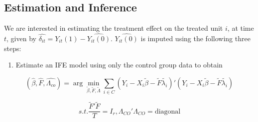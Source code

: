 \documentclass[12pt,nobind, a4paper]{reedthesis}
\providecommand{\tightlist}{%
	\setlength{\itemsep}{0pt}\setlength{\parskip}{0pt}}
\begin{document}
 \hypertarget{estimation-and-inference}{%
 \subsection{Estimation and Inference}\label{estimation-and-inference}}

 We are interested in estimating the treatment effect on the treated unit \(i\), at time \(t\), given by \(\hat{\delta_{it}}= Y_{it}(1)-\hat{Y_{it}(0)}\). \(\hat{Y_{it}(0)}\) is imputed using the following three steps:
 \linebreak
 \begin{enumerate}
 \def\labelenumi{\arabic{enumi}.}
 \tightlist
 \item
   Estimate an IFE model using only the control group data to obtain
 \end{enumerate}
 \[(\hat{\beta},\hat{F},\hat{\Lambda_{co}})=\arg\min_{\tilde{\beta},\tilde{F},\tilde{\Lambda}}\sum_{i\in C}(Y_{i}-X_{i} \tilde{\beta}-\tilde{F}\tilde{\lambda_{i}})'(Y_{i}-X_{i}\tilde{\beta}-\tilde{F}\tilde{\lambda_{i}})\]

 \[s.t. \frac{\tilde{F}'\tilde{F}}{T}=I_{r}
 , \Lambda_{CO}'\Lambda_{CO}=\text{diagonal}\]
\end{document}
